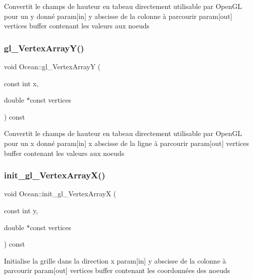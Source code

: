 Convertit le champs de hauteur en tabeau directement utilisable par Open\+GL pour un y donné param\mbox{[}in\mbox{]} y abscisse de la colonne à parcourir param\mbox{[}out\mbox{]} vertices buffer contenant les valeurs aux noeuds \hypertarget{class_ocean_a1100e965070ccb68a8f0bec5d5b60a5c}{}\label{class_ocean_a1100e965070ccb68a8f0bec5d5b60a5c} 
\subsubsection{\texorpdfstring{gl\+\_\+\+Vertex\+Array\+Y()}{gl\_VertexArrayY()}}
{\footnotesize\ttfamily void Ocean\+::gl\+\_\+\+Vertex\+ArrayY (\begin{DoxyParamCaption}\item[{const int}]{x,  }\item[{double $\ast$const}]{vertices }\end{DoxyParamCaption}) const}

Convertit le champs de hauteur en tabeau directement utilisable par Open\+GL pour un x donné param\mbox{[}in\mbox{]} x abscisse de la ligne à parcourir param\mbox{[}out\mbox{]} vertices buffer contenant les valeurs aux noeuds \hypertarget{class_ocean_ad10379d1f92b154eca3936860c96b4f4}{}\label{class_ocean_ad10379d1f92b154eca3936860c96b4f4} 
\subsubsection{\texorpdfstring{init\+\_\+gl\+\_\+\+Vertex\+Array\+X()}{init\_gl\_VertexArrayX()}}
{\footnotesize\ttfamily void Ocean\+::init\+\_\+gl\+\_\+\+Vertex\+ArrayX (\begin{DoxyParamCaption}\item[{const int}]{y,  }\item[{double $\ast$const}]{vertices }\end{DoxyParamCaption}) const}

Initialise la grille dans la direction x param\mbox{[}in\mbox{]} y abscisse de la colonne à parcourir param\mbox{[}out\mbox{]} vertices buffer contenant les coordonnées des noeuds \hypertarget{class_ocean_a1adbab4eeb806026aff3fb730ca3fe5c}{}\label{class_ocean_a1adbab4eeb806026aff3fb730ca3fe5c} 
